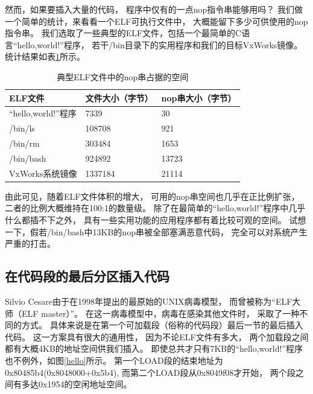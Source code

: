 然而，如果要插入大量的代码，
程序中仅有的一点nop指令串能够用吗？
我们做一个简单的统计，来看看一个ELF可执行文件中，
大概能留下多少可供使用的nop指令串。
我们选取了一些典型的ELF文件，包括一个最简单的C语言“hello,world!”程序，
若干/bin目录下的实用程序和我们的目标VxWorks镜像。
统计结果如表\ref{nopbytes}所示。

\begin{table}
  \centering
  \caption{典型ELF文件中的nop串占据的空间}
  \label{nopbytes}
  \begin{tabular}{l|l|l}
     \hline
     ELF文件       & 文件大小（字节）& nop串大小（字节） \\ \hline
 “hello,world!”程序  & 7339           & 30                 \\ \hline
     /bin/ls      & 108708          & 921                \\ \hline
     /bin/rm      & 303484         & 1653                \\ \hline  
     /bin/bash    & 924892        & 13723              \\ \hline
     VxWorks系统镜像 & 1337184        & 21114              \\ \hline
  \end{tabular}
\end{table}  

由此可见，随着ELF文件体积的增大，
可用的nop串空间也几乎在正比例扩张，
二者的比例大概维持在100:1的数量级。
除了在最简单的“hello,world!”程序中几乎什么都插不下之外，
具有一些实用功能的应用程序都有着比较可观的空间。
试想一下，假若/bin/bash中13KB的nop串被全部塞满恶意代码，
完全可以对系统产生严重的打击。



\subsection{在代码段的最后分区插入代码}
\label{after}

Silvio Cesare由于在1998年提出的最原始的UNIX病毒模型，
而曾被称为“ELF大师（ELF master）”。
在这一病毒模型中，病毒在感染其他文件时，
采取了一种不同的方式。
具体来说是在第一个可加载段（俗称的代码段）最后一节的最后插入代码。
这一方案具有很大的通用性，
因为不论ELF文件有多大，
两个加载段之间都有大概4KB的地址空间供我们插入。
即使总共才只有7KB的“hello,world!”程序也不例外，如图\ref{hello}所示。
第一个LOAD段的结束地址为0x80485b4(0x8048000+0x5b4),
而第二个LOAD段从0x8049f08才开始，
两个段之间有多达0x1954的空闲地址空间。

